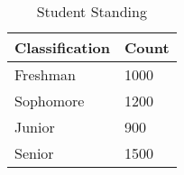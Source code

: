 \begin{table}[!htbp] \centering \renewcommand*{\arraystretch}{1.1}\caption{Student Standing}\label{tab:describingvariables-studstanding}
\begin{tabular}{ll}
\hline
\hline
Classification & Count \\ 
\hline
Freshman & 1000 \\ 
Sophomore & 1200 \\ 
Junior & 900 \\ 
Senior & 1500\\ 
\hline
\hline
\end{tabular}
\end{table}

